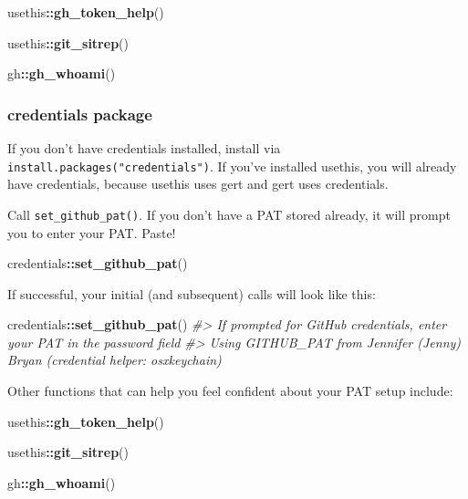 \documentclass[
]{book}
\newenvironment{Shaded}{\begin{snugshade}}{\end{snugshade}}
\newcommand{\CommentTok}[1]{\textcolor[rgb]{0.56,0.35,0.01}{\textit{#1}}}
\newcommand{\FunctionTok}[1]{\textcolor[rgb]{0.13,0.29,0.53}{\textbf{#1}}}
\newcommand{\NormalTok}[1]{#1}
\newcommand{\SpecialCharTok}[1]{\textcolor[rgb]{0.81,0.36,0.00}{\textbf{#1}}}
\begin{document}
\begin{Shaded}
\begin{Highlighting}[]
\NormalTok{usethis}\SpecialCharTok{::}\FunctionTok{gh\_token\_help}\NormalTok{()}

\NormalTok{usethis}\SpecialCharTok{::}\FunctionTok{git\_sitrep}\NormalTok{()}

\NormalTok{gh}\SpecialCharTok{::}\FunctionTok{gh\_whoami}\NormalTok{()}
\end{Highlighting}
\end{Shaded}

\subsubsection{credentials package}\label{credentials-package}

If you don't have credentials installed, install via \texttt{install.packages("credentials")}.
If you've installed usethis, you will already have credentials, because usethis uses gert and gert uses credentials.

Call \texttt{set\_github\_pat()}.
If you don't have a PAT stored already, it will prompt you to enter your PAT. Paste!

\begin{Shaded}
\begin{Highlighting}[]
\NormalTok{credentials}\SpecialCharTok{::}\FunctionTok{set\_github\_pat}\NormalTok{()}
\end{Highlighting}
\end{Shaded}

If successful, your initial (and subsequent) calls will look like this:

\begin{Shaded}
\begin{Highlighting}[]
\NormalTok{credentials}\SpecialCharTok{::}\FunctionTok{set\_github\_pat}\NormalTok{()}
\CommentTok{\#\textgreater{} If prompted for GitHub credentials, enter your PAT in the password field}
\CommentTok{\#\textgreater{} Using GITHUB\_PAT from Jennifer (Jenny) Bryan (credential helper: osxkeychain)}
\end{Highlighting}
\end{Shaded}

Other functions that can help you feel confident about your PAT setup include:

\begin{Shaded}
\begin{Highlighting}[]
\NormalTok{usethis}\SpecialCharTok{::}\FunctionTok{gh\_token\_help}\NormalTok{()}

\NormalTok{usethis}\SpecialCharTok{::}\FunctionTok{git\_sitrep}\NormalTok{()}

\NormalTok{gh}\SpecialCharTok{::}\FunctionTok{gh\_whoami}\NormalTok{()}
\end{Highlighting}
\end{Shaded}
\end{document}

